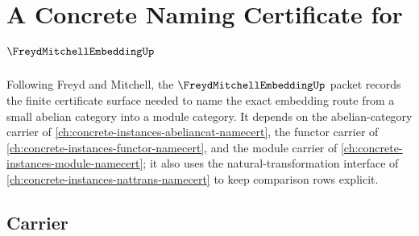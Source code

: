 \chapter{A Concrete Naming Certificate for $\FreydMitchellEmbeddingUp$}
\label{ch:concrete-instances-freyd-mitchell-embedding-namecert}

Following Freyd and Mitchell, the $\FreydMitchellEmbeddingUp$ packet records the finite certificate surface needed to name the exact embedding route from a small abelian category into a module category. It depends on the abelian-category carrier of \autoref{ch:concrete-instances-abeliancat-namecert}, the functor carrier of \autoref{ch:concrete-instances-functor-namecert}, and the module carrier of \autoref{ch:concrete-instances-module-namecert}; it also uses the natural-transformation interface of \autoref{ch:concrete-instances-nattrans-namecert} to keep comparison rows explicit.

\section{Carrier}
\label{sec:freyd-mitchell-embedding-carrier}

